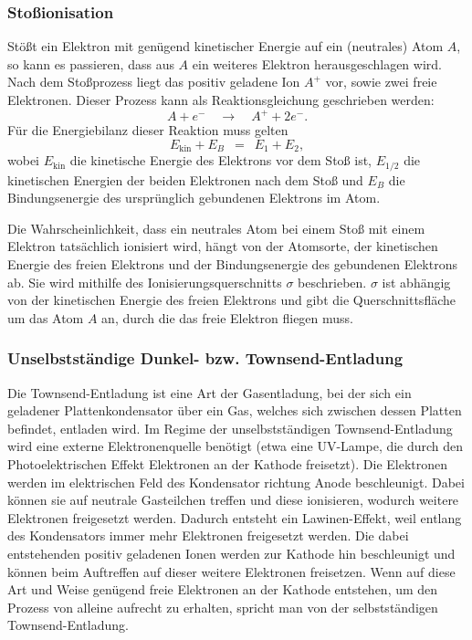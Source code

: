 \documentclass{article}
\newcommand{\widespace}{\enspace}
\newcommand{\wideeq}{\widespace = \widespace}
\begin{document}
\cite[155--161]{demtröder}


\subsubsection{Stoßionisation}

Stößt ein Elektron mit genügend kinetischer Energie auf ein (neutrales) Atom $A$,
so kann es passieren, dass aus $A$ ein weiteres Elektron herausgeschlagen wird.
Nach dem Stoßprozess liegt das positiv geladene Ion $A^+$ vor, sowie zwei
freie Elektronen. Dieser Prozess kann als Reaktionsgleichung geschrieben werden:
\[
    A + e^- \quad \longrightarrow \quad A^+ + 2 e^-.
\]
Für die Energiebilanz dieser Reaktion muss gelten
\[
    E_\text{kin} + E_B \wideeq E_1 + E_2,
\]
wobei $E_\text{kin}$ die kinetische Energie des Elektrons vor dem Stoß ist,
$E_{1/2}$ die kinetischen Energien der beiden Elektronen nach dem Stoß
und $E_B$ die Bindungsenergie des ursprünglich gebundenen Elektrons im Atom.

Die Wahrscheinlichkeit, dass ein neutrales Atom bei einem Stoß mit einem Elektron
tatsächlich ionisiert wird, hängt von der Atomsorte, der kinetischen Energie des
freien Elektrons und der Bindungsenergie des gebundenen Elektrons ab.
Sie wird mithilfe des Ionisierungsquerschnitts $\sigma$ beschrieben.
$\sigma$ ist abhängig von der kinetischen Energie des freien Elektrons und gibt
die Querschnittsfläche um das Atom $A$ an, durch die das freie Elektron
fliegen muss.

\cite[34--35]{demtröder}


\subsubsection{Unselbstständige Dunkel- bzw. Townsend-Entladung}

Die Townsend-Entladung ist eine Art der Gasentladung, bei der sich ein geladener
Plattenkondensator über ein Gas, welches sich zwischen dessen Platten befindet,
entladen wird. Im Regime der unselbstständigen Townsend-Entladung
wird eine externe Elektronenquelle benötigt (etwa eine UV-Lampe, die durch den
Photoelektrischen Effekt Elektronen an der Kathode freisetzt).
Die Elektronen werden im elektrischen Feld des Kondensator richtung Anode
beschleunigt. Dabei können sie auf neutrale Gasteilchen treffen und diese
ionisieren, wodurch weitere Elektronen freigesetzt werden.
Dadurch entsteht ein Lawinen-Effekt, weil entlang des Kondensators immer mehr
Elektronen freigesetzt werden.
Die dabei entstehenden positiv geladenen Ionen werden zur Kathode hin beschleunigt
und können beim Auftreffen auf dieser weitere Elektronen freisetzen.
Wenn auf diese Art und Weise genügend freie Elektronen an der Kathode entstehen,
um den Prozess von alleine aufrecht zu erhalten, spricht man von der selbstständigen
Townsend-Entladung.
\end{document}
